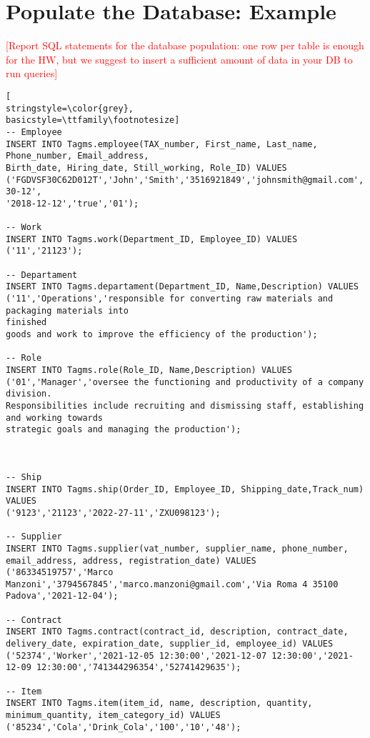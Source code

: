 
\section{Populate the Database: Example}
\textcolor{red}{[Report SQL statements for the database population: one row per table is enough for the HW, but we suggest to insert a sufficient amount of data in your DB to run queries]}


\begin{lstlisting}[
stringstyle=\color{grey},
basicstyle=\ttfamily\footnotesize]
-- Employee
INSERT INTO Tagms.employee(TAX_number, First_name, Last_name, Phone_number, Email_address,
Birth_date, Hiring_date, Still_working, Role_ID) VALUES
('FGDVSF30C62D012T','John','Smith','3516921849','johnsmith@gmail.com','1995-30-12',
'2018-12-12','true','01');

-- Work
INSERT INTO Tagms.work(Department_ID, Employee_ID) VALUES 
('11','21123');

-- Departament
INSERT INTO Tagms.departament(Department_ID, Name,Description) VALUES
('11','Operations','responsible for converting raw materials and packaging materials into 
finished
goods and work to improve the efficiency of the production');

-- Role
INSERT INTO Tagms.role(Role_ID, Name,Description) VALUES 
('01','Manager','oversee the functioning and productivity of a company division.
Responsibilities include recruiting and dismissing staff, establishing and working towards 
strategic goals and managing the production');



-- Ship
INSERT INTO Tagms.ship(Order_ID, Employee_ID, Shipping_date,Track_num) VALUES 
('9123','21123','2022-27-11','ZXU098123');

-- Supplier
INSERT INTO Tagms.supplier(vat_number, supplier_name, phone_number, email_address, address, registration_date) VALUES
('86334519757','Marco Manzoni','3794567845','marco.manzoni@gmail.com','Via Roma 4 35100 Padova','2021-12-04');

-- Contract
INSERT INTO Tagms.contract(contract_id, description, contract_date, delivery_date, expiration_date, supplier_id, employee_id) VALUES 
('52374','Worker','2021-12-05 12:30:00','2021-12-07 12:30:00','2021-12-09 12:30:00','741344296354','52741429635');

-- Item
INSERT INTO Tagms.item(item_id, name, description, quantity, minimum_quantity, item_category_id) VALUES 
('85234','Cola','Drink_Cola','100','10','48');


\end{lstlisting}
